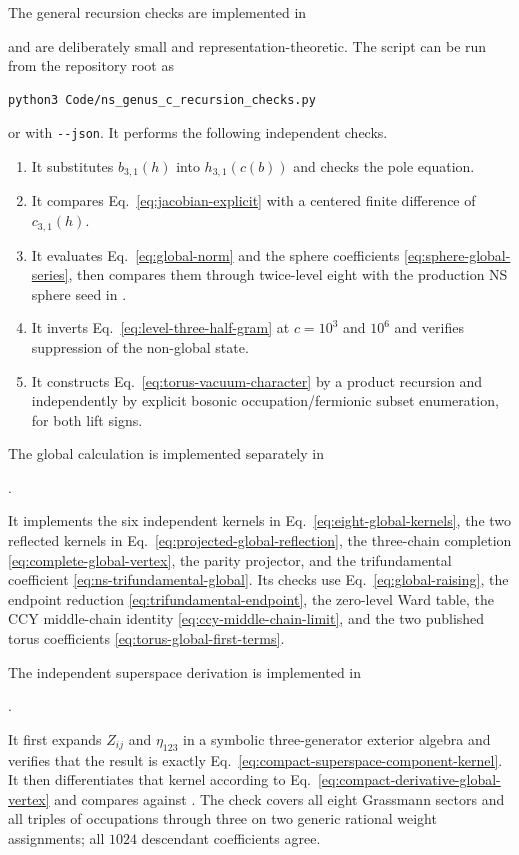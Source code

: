 \documentclass[11pt]{article}
\begin{document}
The general recursion checks are implemented in
\begin{center}
\end{center}
and are deliberately small and representation-theoretic.  The script can be
run from the
repository root as
\begin{verbatim}
python3 Code/ns_genus_c_recursion_checks.py
\end{verbatim}
or with \verb|--json|.  It performs the following independent checks.
\begin{enumerate}
 \item It substitutes \(b_{3,1}(h)\) into
 \(h_{3,1}(c(b))\) and checks the pole equation.
 \item It compares Eq.~\eqref{eq:jacobian-explicit} with a centered finite
 difference of \(c_{3,1}(h)\).
 \item It evaluates Eq.~\eqref{eq:global-norm} and the sphere coefficients
 \eqref{eq:sphere-global-series}, then compares them through twice-level
 eight with the production NS sphere seed in
 .
 \item It inverts Eq.~\eqref{eq:level-three-half-gram} at
 \(c=10^3\) and \(10^6\) and verifies suppression of the non-global
 state.
 \item It constructs Eq.~\eqref{eq:torus-vacuum-character} by a product
 recursion and independently by explicit bosonic occupation/fermionic subset
 enumeration, for both lift signs.
\end{enumerate}
The global calculation is implemented separately in
\begin{center}
 .
\end{center}
It implements the six independent kernels in
Eq.~\eqref{eq:eight-global-kernels}, the two reflected kernels in
Eq.~\eqref{eq:projected-global-reflection}, the
three-chain completion \eqref{eq:complete-global-vertex}, the parity
projector, and the trifundamental coefficient
\eqref{eq:ns-trifundamental-global}.  Its checks use
Eq.~\eqref{eq:global-raising}, the endpoint reduction
\eqref{eq:trifundamental-endpoint}, the zero-level Ward table, the CCY
middle-chain identity \eqref{eq:ccy-middle-chain-limit}, and the two
published torus coefficients \eqref{eq:torus-global-first-terms}.

The independent superspace derivation is implemented in
\begin{center}
 .
\end{center}
It first expands \(Z_{ij}\) and \(\eta_{123}\) in a symbolic three-generator
exterior algebra and verifies that the result is exactly
Eq.~\eqref{eq:compact-superspace-component-kernel}.  It then differentiates
that kernel according to Eq.~\eqref{eq:compact-derivative-global-vertex} and
compares against .  The check covers all
eight Grassmann sectors and all triples of occupations through three on two
generic rational weight assignments; all \(1024\) descendant coefficients
agree.
\end{document}

